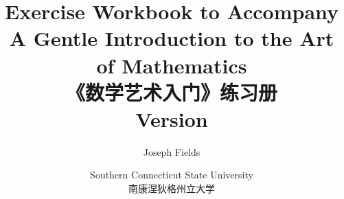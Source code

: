 \documentclass[12pt,twoside]{book}
\begin{document}
\frontmatter

\title{Exercise Workbook to Accompany \\
A Gentle Introduction to the Art of Mathematics\\ 《数学艺术入门》练习册 \\{\small Version \versionNum
{} }}
\author{Joseph Fields}
\date{Southern Connecticut State University \\ 南康涅狄格州立大学}

\maketitle

\clearpage




\clearpage

\mainmatter










\end{document}
